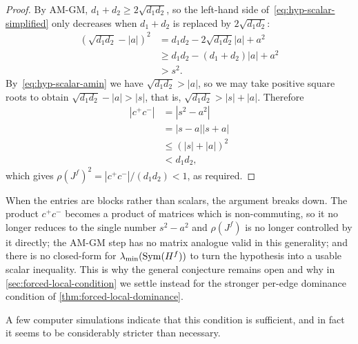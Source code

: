 \begin{proof}
	By AM-GM, $d_1 + d_2 \geq 2 \sqrt{d_1 d_2}$, so the left-hand side of~\eqref{eq:hyp-scalar-simplified} only decreases when $d_1 + d_2$ is replaced by $2\sqrt{d_1 d_2}$:
	\begin{align*}
		\left(\sqrt{d_1 d_2} - |a|\right)^2
		&= d_1 d_2 - 2 \sqrt{d_1 d_2}|a| + a^2 \\
		&\geq d_1 d_2 - (d_1 + d_2)|a| + a^2 \\
		& > s^2.
	\end{align*}
	By~\eqref{eq:hyp-scalar-amin} we have $\sqrt{d_1 d_2} > |a|$, so we may take positive square roots to obtain $\sqrt{d_1 d_2} - |a| > |s|$, that is, $\sqrt{d_1 d_2} > |s| + |a|$. Therefore
	\begin{align*}
		|c^+ c^-| 
		&= |s^2 - a^2| \\
		&= |s - a| |s + a| \\
		&\leq (|s| + |a|)^2 \\
		&< d_1 d_2,
	\end{align*}
	which gives ${\rho(J^f)}^2 = |c^+ c^-|/(d_1 d_2) < 1$, as required.
\end{proof}

When the entries are blocks rather than scalars, the argument breaks down. The product $c^+ c^-$ becomes a product of matrices which is non-commuting, so it no longer reduces to the single number $s^2 - a^2$ and $\rho(J^f)$ is no longer controlled by it directly; the AM-GM step has no matrix analogue valid in this generality; and there is no closed-form for $\lambda_{\min}(\operatorname{Sym}(H^f))$ to turn the hypothesis into a usable scalar inequality. This is why the general conjecture remains open and why in \cref{sec:forced-local-condition} we settle instead for the stronger per-edge dominance condition of \cref{thm:forced-local-dominance}.

A few computer simulations indicate that this condition is sufficient, and in fact it seems to be considerably stricter than necessary.